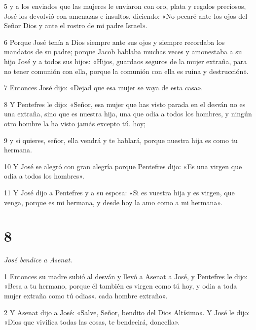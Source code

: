 \par 5 y a los enviados que las mujeres le enviaron con oro, plata y regalos preciosos, José los devolvió con amenazas e insultos, diciendo: «No pecaré ante los ojos del Señor Dios y ante el rostro de mi padre Israel».

\par 6 Porque José tenía a Dios siempre ante sus ojos y siempre recordaba los mandatos de su padre; porque Jacob hablaba muchas veces y amonestaba a su hijo José y a todos sus hijos: «Hijos, guardaos seguros de la mujer extraña, para no tener comunión con ella, porque la comunión con ella es ruina y destrucción».

\par 7 Entonces José dijo: «Dejad que esa mujer se vaya de esta casa».

\par 8 Y Pentefres le dijo: «Señor, esa mujer que has visto parada en el desván no es una extraña, sino que es nuestra hija, una que odia a todos los hombres, y ningún otro hombre la ha visto jamás excepto tú. hoy;

\par 9 y si quieres, señor, ella vendrá y te hablará, porque nuestra hija es como tu hermana.

\par 10 Y José se alegró con gran alegría porque Pentefres dijo: «Es una virgen que odia a todos los hombres».

\par 11 Y José dijo a Pentefres y a su esposa: «Si es vuestra hija y es virgen, que venga, porque es mi hermana, y desde hoy la amo como a mi hermana».

\chapter{8}


\par \textit{José bendice a Asenat.}

\par 1 Entonces su madre subió al desván y llevó a Asenat a José, y Pentefres le dijo: «Besa a tu hermano, porque él también es virgen como tú hoy, y odia a toda mujer extraña como tú odias». cada hombre extraño».

\par 2 Y Asenat dijo a José: «Salve, Señor, bendito del Dios Altísimo». Y José le dijo: «Dios que vivifica todas las cosas, te bendecirá, doncella».

